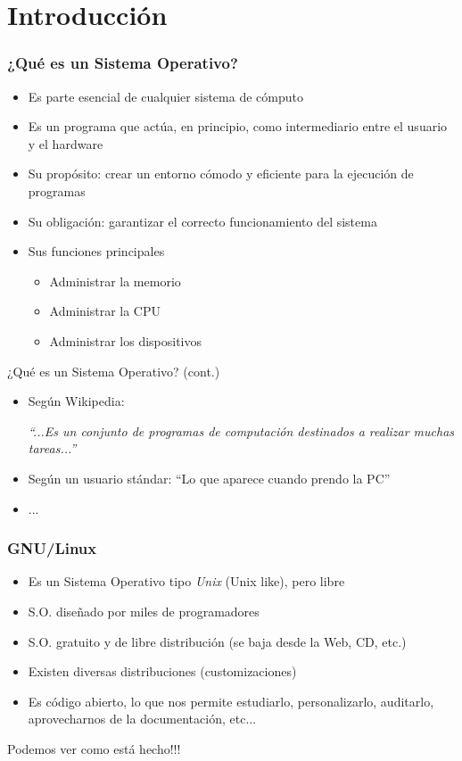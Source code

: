 \section{Introducción}
\begin{frame}
  \frametitle{¿Qué es un Sistema Operativo?}
  \begin{itemize}
  \item Es parte esencial de cualquier sistema de cómputo
  \item Es un programa que actúa, en principio, como intermediario entre el usuario y el hardware
  \item Su propósito: crear un entorno cómodo y eficiente para la ejecución de programas
  \item Su obligación: garantizar el correcto funcionamiento del sistema
  \item Sus funciones principales
	  \begin{itemize}
		  \item Administrar la memorio
		  \item Administrar la CPU
		  \item Administrar los dispositivos
	  \end{itemize}
  \end{itemize}
\end{frame}

\begin{frame}{¿Qué es un Sistema Operativo? (cont.)}
  \begin{itemize}
  \item Según Wikipedia:
  
   \textit{``...Es un conjunto de programas de computación destinados a realizar muchas tareas...''}
  \item Según un usuario stándar: ``Lo que aparece cuando prendo la PC''
  \item ...
  \end{itemize}
\end{frame}

\begin{frame}
	\frametitle{GNU/Linux}
	\begin{itemize}
		\item Es un Sistema Operativo tipo \textit{Unix} (Unix like), pero libre
		\item S.O. diseñado por miles de programadores
		\item S.O. gratuito y de libre distribución (se baja desde la Web, CD, etc.)
		\item Existen diversas distribuciones (customizaciones)
		\item \alert{Es código abierto}, lo que nos permite estudiarlo, personalizarlo, auditarlo, aprovecharnos de la documentación, etc...
	\end{itemize}
	\centerline{\alert{Podemos ver como está hecho!!!}}
\end{frame}

